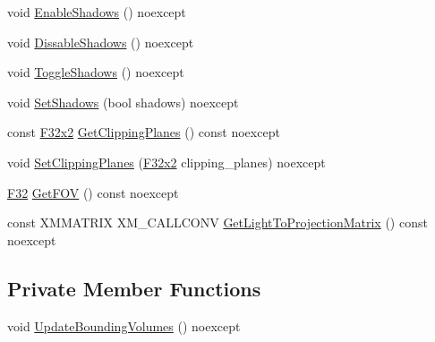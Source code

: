 \begin{DoxyCompactItemize}
\item 
void \mbox{\hyperlink{classmage_1_1rendering_1_1_spot_light_ace198989b91c5b4ca590dabef5b88e25}{Enable\+Shadows}} () noexcept
\item 
void \mbox{\hyperlink{classmage_1_1rendering_1_1_spot_light_a11897283e223ed345a2d04738e7fc267}{Dissable\+Shadows}} () noexcept
\item 
void \mbox{\hyperlink{classmage_1_1rendering_1_1_spot_light_a4e6412e05d894a97409c23d8d088cabf}{Toggle\+Shadows}} () noexcept
\item 
void \mbox{\hyperlink{classmage_1_1rendering_1_1_spot_light_af1f1d3aee8bdcda50d16f4b0551e4728}{Set\+Shadows}} (bool shadows) noexcept
\item 
const \mbox{\hyperlink{namespacemage_a9dc0d34d6ecc87e4cfa4a826102117bc}{F32x2}} \mbox{\hyperlink{classmage_1_1rendering_1_1_spot_light_ae3149920d30b92433025fcd4bc8188e9}{Get\+Clipping\+Planes}} () const noexcept
\item 
void \mbox{\hyperlink{classmage_1_1rendering_1_1_spot_light_a9a4c2e827e91d7ec79118217376c9c6e}{Set\+Clipping\+Planes}} (\mbox{\hyperlink{namespacemage_a9dc0d34d6ecc87e4cfa4a826102117bc}{F32x2}} clipping\+\_\+planes) noexcept
\item 
\mbox{\hyperlink{namespacemage_aa97e833b45f06d60a0a9c4fc22ae02c0}{F32}} \mbox{\hyperlink{classmage_1_1rendering_1_1_spot_light_a22527d940bc7601285429b36e8d97490}{Get\+F\+OV}} () const noexcept
\item 
const X\+M\+M\+A\+T\+R\+IX X\+M\+\_\+\+C\+A\+L\+L\+C\+O\+NV \mbox{\hyperlink{classmage_1_1rendering_1_1_spot_light_ad617d1c098e2ca222a9736b8c45fa0c8}{Get\+Light\+To\+Projection\+Matrix}} () const noexcept
\end{DoxyCompactItemize}
\subsection*{Private Member Functions}
\begin{DoxyCompactItemize}
\item 
void \mbox{\hyperlink{classmage_1_1rendering_1_1_spot_light_aa225a105edf22a1a430a1c3aa42bc490}{Update\+Bounding\+Volumes}} () noexcept
\end{DoxyCompactItemize}
